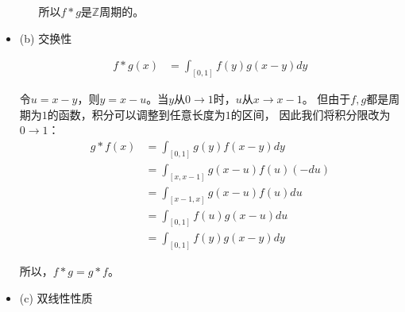 \documentclass{article}
\begin{document}
\begin{itemize}
\begin{itemize}
                所以$f \ast g$是$\mathbb{Z}$周期的。
        \end{itemize}

  \item (b) 交换性

        \begin{align*}
          f \ast g (x) & = \int_{[0, 1]} f(y) g(x - y) dy
        \end{align*}

        令$u = x - y$，则$y = x - u$。当$y$从$0 \to 1$时，$u$从$x \to x - 1$。
        但由于$f,g$都是周期为$1$的函数，积分可以调整到任意长度为$1$的区间，
        因此我们将积分限改为$0 \to 1$：
        \begin{align*}
          g \ast f (x) & = \int_{[0, 1]} g(y) f(x - y) dy      \\
                       & = \int_{[x, x-1]} g(x - u) f(u) (-du) \\
                       & = \int_{[x - 1, x]} g(x - u) f(u) du  \\
                       & = \int_{[0, 1]} f(u) g(x - u)  du     \\
                       & = \int_{[0, 1]} f(y) g(x - y) dy
        \end{align*}

        所以，$f \ast g = g \ast f$。

  \item (c) 双线性性质
\end{itemize}
\end{document}
